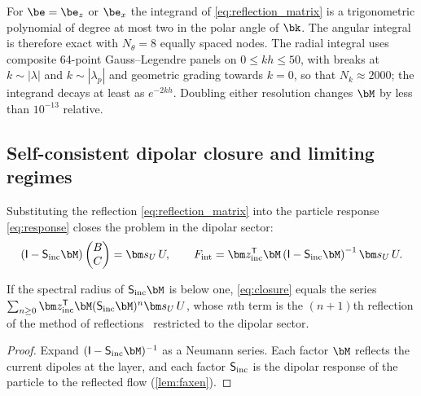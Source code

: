 For $\be=\be_z$ or $\be_x$ the integrand of \cref{eq:reflection_matrix} is a trigonometric polynomial of degree at most
two in the polar angle of $\bk$. The angular integral is therefore exact with $N_\theta=8$ equally spaced nodes. The
radial integral uses composite 64-point Gauss--Legendre panels on $0\le kh\le50$, with breaks at $k\sim|\lambda|$ and
$k\sim|\lambda_p|$ and geometric grading towards $k=0$, so that $N_k\approx2000$; the integrand decays at least as
$e^{-2kh}$. Doubling either resolution changes $\bM$ by less than $10^{-13}$ relative.

\subsection{Self-consistent dipolar closure and limiting regimes}\label{sec:closure}
Substituting the reflection \eqref{eq:reflection_matrix} into the particle response \eqref{eq:response} closes the
problem in the dipolar sector:
\begin{equation}
  \left(\mathsf I-\mathsf S_{\rm inc}\bM\right)\begin{pmatrix}B\\ C\end{pmatrix}=\bm s_U\,U,
  \qquad
  F_{\rm int}=\bm z_{\rm inc}^{\mathsf T}\bM\left(\mathsf I-\mathsf S_{\rm inc}\bM\right)^{-1}\bm s_U\,U .
  \label{eq:closure}
\end{equation}
\begin{proposition}\label{prop:series}
If the spectral radius of $\mathsf S_{\rm inc}\bM$ is below one, \cref{eq:closure} equals the series
$\sum_{n\ge0}\bm z_{\rm inc}^{\mathsf T}\bM(\mathsf S_{\rm inc}\bM)^n\bm s_U\,U$, whose $n$th term is the $(n+1)$th
reflection of the method of reflections~\cite{simha2018unsteady} restricted to the dipolar sector.
\end{proposition}
\begin{proof}
Expand $(\mathsf I-\mathsf S_{\rm inc}\bM)^{-1}$ as a Neumann series. Each factor $\bM$ reflects the current dipoles at
the layer, and each factor $\mathsf S_{\rm inc}$ is the dipolar response of the particle to the reflected flow
(\cref{lem:faxen}).
\end{proof}


